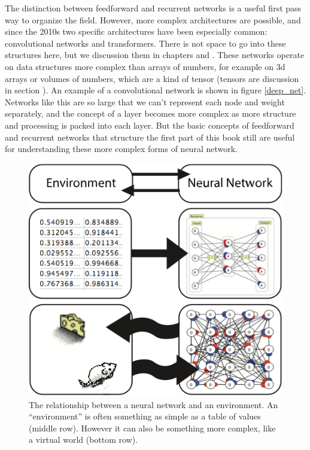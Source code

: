The distinction between feedforward and recurrent networks is a useful first pass way to organize the field. However, more complex architectures are possible, and since the 2010s two specific architectures have been especially common: convolutional networks and transformers.  There is not space to go into these structures here, but we discussion them in chapters  and . These networks operate on data structures more complex than arrays of numbers, for example on 3d arrays or volumes of numbers, which are a kind of tensor (tensors are discussion in section ). An example of a convolutional network is shown in figure \ref{deep_net}. Networks like this are so large that we can't represent each node and weight separately, and the concept of a layer becomes more complex as more structure and processing is packed into each layer. But the basic concepts of feedforward and recurrent networks that structure the first part of this book still are useful for understanding these more complex forms of neural network. 

\begin{figure}[h]
\centering
\includegraphics[scale=.7]{./images/nn_environment.png}
\caption[Pamela Payne.]{The relationship between a neural network and an environment. An ``environment'' is often something as simple as a table of values (middle row). However it can also be something more complex, like a virtual world (bottom row).}
\label{nn_environment}
\end{figure}

